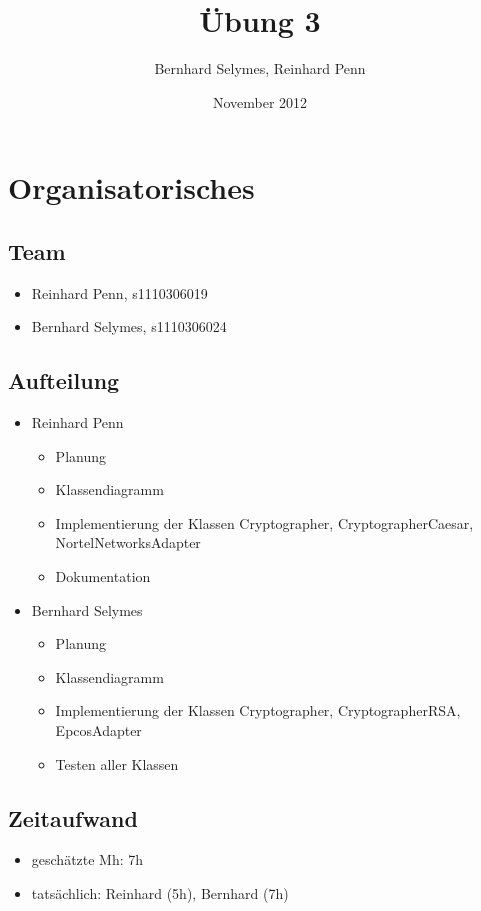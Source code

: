 \documentclass[12pt,a4paper]{article}
\begin{document}
\title{Übung 3}
\author{Bernhard Selymes, Reinhard Penn}
\date{November 2012}

\normalsize

\newcommand{\CodePath}{../Cryptography/Cryptography/}

\section{Organisatorisches}

\subsection{Team}
	\begin {itemize} 
		\item Reinhard Penn, s1110306019 
		\item Bernhard Selymes, s1110306024
	\end {itemize}

\subsection{Aufteilung}
	\begin {itemize} 
		\item Reinhard Penn
			\begin {itemize}
				\item Planung
				\item Klassendiagramm
				\item Implementierung der Klassen Cryptographer, CryptographerCaesar, NortelNetworksAdapter
				\item Dokumentation 
			\end {itemize}
		\item Bernhard Selymes
			\begin {itemize}
				\item Planung
				\item Klassendiagramm
				\item Implementierung der Klassen Cryptographer, CryptographerRSA, EpcosAdapter
				\item Testen aller Klassen			
			\end {itemize}
	\end {itemize}


\subsection{Zeitaufwand}
	\begin {itemize}
		\item geschätzte Mh: 7h
		\item tatsächlich: Reinhard (5h), Bernhard  (7h)
	\end {itemize}
\end{document}
